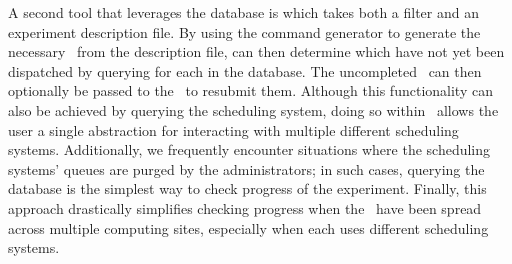 A second tool that leverages the database is  which takes
both a  filter and an experiment description file.  By using the
command generator to generate the necessary \subs\ from the description file,
 can then determine which have not yet been dispatched by
querying for each in the database.  The uncompleted \subs\ can then optionally
be passed to the \dispatcher\ to resubmit them.  Although this functionality
can also be achieved by querying the scheduling system, doing so within \name\
allows the user a single abstraction for interacting with multiple different
scheduling systems.  Additionally, we frequently encounter situations where the
scheduling systems' queues are purged by the administrators; in such cases,
querying the database is the simplest way to check progress of the experiment.
Finally, this approach drastically simplifies checking progress when the \subs\
have been spread across multiple computing sites, especially when each uses
different scheduling systems. 
